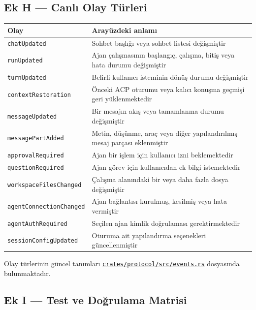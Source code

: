 \documentclass[
  turkish,
  10pt,
  a4paper,
]{article}
\begin{document}
\subsection{Ek H --- Canlı Olay
Türleri}\label{ek-h--canlux131-olay-tuxfcrleri}

\begin{longtable}[]{@{}ll@{}}
\toprule\noalign{}
Olay & Arayüzdeki anlamı \\
\midrule\noalign{}
\endhead
\bottomrule\noalign{}
\endlastfoot
\texttt{chatUpdated} & Sohbet başlığı veya sohbet listesi değişmiştir \\
\texttt{runUpdated} & Ajan çalışmasının başlangıç, çalışma, bitiş veya
hata durumu değişmiştir \\
\texttt{turnUpdated} & Belirli kullanıcı isteminin dönüş durumu
değişmiştir \\
\texttt{contextRestoration} & Önceki ACP oturumu veya kalıcı konuşma
geçmişi geri yüklenmektedir \\
\texttt{messageUpdated} & Bir mesajın akış veya tamamlanma durumu
değişmiştir \\
\texttt{messagePartAdded} & Metin, düşünme, araç veya diğer
yapılandırılmış mesaj parçası eklenmiştir \\
\texttt{approvalRequired} & Ajan bir işlem için kullanıcı izni
beklemektedir \\
\texttt{questionRequired} & Ajan görev için kullanıcıdan ek bilgi
istemektedir \\
\texttt{workspaceFilesChanged} & Çalışma alanındaki bir veya daha fazla
dosya değişmiştir \\
\texttt{agentConnectionChanged} & Ajan bağlantısı kurulmuş, kesilmiş
veya hata vermiştir \\
\texttt{agentAuthRequired} & Seçilen ajan kimlik doğrulaması
gerektirmektedir \\
\texttt{sessionConfigUpdated} & Oturuma ait yapılandırma seçenekleri
güncellenmiştir \\
\end{longtable}

Olay türlerinin güncel tanımları
\href{https://github.com/amar-jay/amarcode/blob/main/crates/protocol/src/events.rs}{\texttt{crates/protocol/src/events.rs}}
dosyasında bulunmaktadır.

\subsection{Ek I --- Test ve Doğrulama
Matrisi}\label{ek-i--test-ve-doux11frulama-matrisi}
\end{document}
